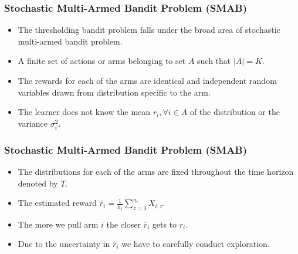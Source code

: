 \begin{frame}
\frametitle{Stochastic Multi-Armed Bandit Problem (SMAB)}
\begin{itemize}
\item<1-> The thresholding bandit problem falls under the broad area of stochastic multi-armed bandit problem.
\item<2-> A finite set of actions or arms belonging to set $A$ such that $|A|=K$. 
\item<3-> The rewards for each of the arms are identical and independent random variables drawn from distribution specific to the arm.
\item<4-> The learner does not know the mean $r_{i},\forall i\in A$ of the distribution or the variance $\sigma_i^2$. 
\end{itemize}
\end{frame}

\begin{frame}
\frametitle{Stochastic Multi-Armed Bandit Problem (SMAB)}
\begin{itemize}
\item<1-> The distributions for each of the arms are fixed throughout the time horizon denoted by $T$. 
\item<2-> The estimated reward $\hat{r}_{i}=\frac{1}{n_{i}}\sum_{z=1}^{n_i} X_{i,z}$.
\item<3-> The more we pull arm $i$ the closer $\hat{r}_i$ gets to $r_i$.
\item<4-> Due to the uncertainty in $\hat{r}_i$ we have to carefully conduct exploration.
\end{itemize}
\end{frame}


